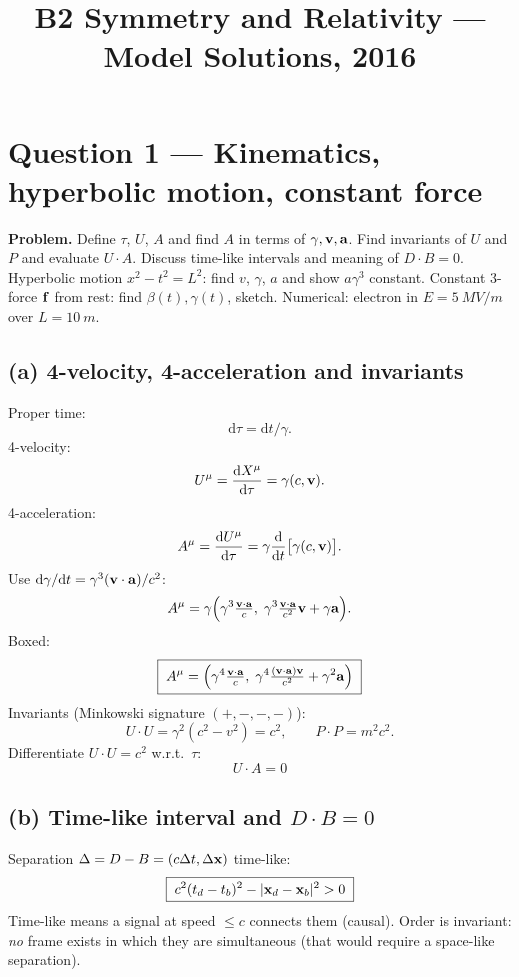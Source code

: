 \documentclass[11pt]{article}
\title{B2 Symmetry and Relativity --- Model Solutions, 2016}
\author{}
\date{}
\newcommand{\de}{\mathrm{d}}
\begin{document}
\maketitle

\section*{Question 1 --- Kinematics, hyperbolic motion, constant force}

\textbf{Problem.} Define $\tau$, $U$, $A$ and find $A$ in terms of $\gamma,\vb v,\vb a$. Find invariants of $U$ and $P$ and evaluate $U\cdot A$. Discuss time-like intervals and meaning of $D\cdot B=0$. Hyperbolic motion $x^2-t^2=L^2$: find $v$, $\gamma$, $a$ and show $a\gamma^3$ constant. Constant 3-force $\vb f$ from rest: find $\beta(t),\gamma(t)$, sketch. Numerical: electron in $E=\SI{5}{MV/m}$ over $L=\SI{10}{m}$.

\subsection*{(a) 4-velocity, 4-acceleration and invariants}

Proper time:
\[ \de\tau = \de t/\gamma. \]
4-velocity:
\[ U^\mu = \frac{\de X^\mu}{\de\tau} = \gamma(c,\vb v). \]
4-acceleration:
\[ A^\mu = \frac{\de U^\mu}{\de\tau} = \gamma\frac{\de}{\de t}\bigl[\gamma(c,\vb v)\bigr]. \]
Use $\de\gamma/\de t = \gamma^3(\vb v\cdot\vb a)/c^2$:
\[ A^\mu = \gamma\Bigl(\gamma^3\tfrac{\vb v\cdot\vb a}{c},\;\gamma^3\tfrac{\vb v\cdot\vb a}{c^2}\vb v + \gamma\vb a\Bigr). \]
Boxed:
\[ \boxed{\;A^\mu = \Bigl(\gamma^4\tfrac{\vb v\cdot\vb a}{c},\;\gamma^4\tfrac{(\vb v\cdot\vb a)\vb v}{c^2} + \gamma^2\vb a\Bigr)\;} \]
Invariants (Minkowski signature $(+,-,-,-)$):
\[ U\cdot U = \gamma^2(c^2 - v^2) = c^2, \qquad P\cdot P = m^2 c^2. \]
Differentiate $U\cdot U = c^2$ w.r.t.\ $\tau$:
\[ \boxed{\;U\cdot A = 0\;} \]

\subsection*{(b) Time-like interval and $D\cdot B=0$}

Separation $\Delta = D - B = (c\Delta t,\Delta\vb x)$ time-like:
\[ \boxed{\;c^2(t_d-t_b)^2 - |\vb x_d-\vb x_b|^2 > 0\;} \]
Time-like means a signal at speed $\le c$ connects them (causal). Order is invariant: \emph{no} frame exists in which they are simultaneous (that would require a space-like separation).
\end{document}
